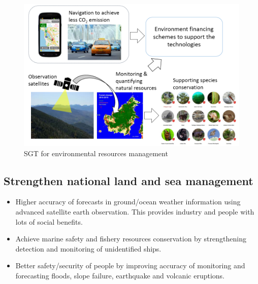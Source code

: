 \begin{figure}[H]
\begin{center}
\includegraphics[width = 0.8\linewidth]{Figures/resource_manag.png}
\end{center}
\caption{SGT for environmental resources management}
\label{resource_manag}
\end{figure}

\subsection{Strengthen national land and sea management}

\begin{itemize}

\item Higher accuracy of forecasts in ground/ocean weather information using advanced satellite earth observation. This provides industry and people  with lots of social benefits.

\item Achieve marine safety and fishery resources conservation by strengthening detection and monitoring of unidentified ships.

\item Better safety/security of people by improving accuracy of monitoring and forecasting floods, slope failure, earthquake and volcanic eruptions.

\end{itemize}

